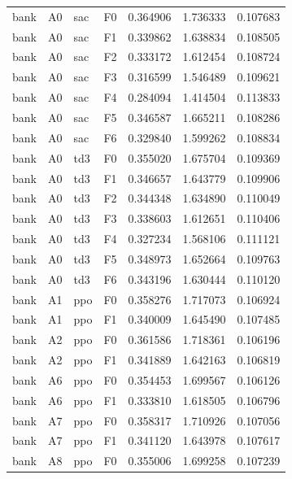 \begin{tabular}{llllrrr}
      bank &      A0 &       sac &  F0 &  0.364906 &  1.736333 &  0.107683 \\
      bank &      A0 &       sac &  F1 &  0.339862 &  1.638834 &  0.108505 \\
      bank &      A0 &       sac &  F2 &  0.333172 &  1.612454 &  0.108724 \\
      bank &      A0 &       sac &  F3 &  0.316599 &  1.546489 &  0.109621 \\
      bank &      A0 &       sac &  F4 &  0.284094 &  1.414504 &  0.113833 \\
      bank &      A0 &       sac &  F5 &  0.346587 &  1.665211 &  0.108286 \\
      bank &      A0 &       sac &  F6 &  0.329840 &  1.599262 &  0.108834 \\
      bank &      A0 &       td3 &  F0 &  0.355020 &  1.675704 &  0.109369 \\
      bank &      A0 &       td3 &  F1 &  0.346657 &  1.643779 &  0.109906 \\
      bank &      A0 &       td3 &  F2 &  0.344348 &  1.634890 &  0.110049 \\
      bank &      A0 &       td3 &  F3 &  0.338603 &  1.612651 &  0.110406 \\
      bank &      A0 &       td3 &  F4 &  0.327234 &  1.568106 &  0.111121 \\
      bank &      A0 &       td3 &  F5 &  0.348973 &  1.652664 &  0.109763 \\
      bank &      A0 &       td3 &  F6 &  0.343196 &  1.630444 &  0.110120 \\
      bank &      A1 &       ppo &  F0 &  0.358276 &  1.717073 &  0.106924 \\
      bank &      A1 &       ppo &  F1 &  0.340009 &  1.645490 &  0.107485 \\
      bank &      A2 &       ppo &  F0 &  0.361586 &  1.718361 &  0.106196 \\
      bank &      A2 &       ppo &  F1 &  0.341889 &  1.642163 &  0.106819 \\
      bank &      A6 &       ppo &  F0 &  0.354453 &  1.699567 &  0.106126 \\
      bank &      A6 &       ppo &  F1 &  0.333810 &  1.618505 &  0.106796 \\
      bank &      A7 &       ppo &  F0 &  0.358317 &  1.710926 &  0.107056 \\
      bank &      A7 &       ppo &  F1 &  0.341120 &  1.643978 &  0.107617 \\
      bank &      A8 &       ppo &  F0 &  0.355006 &  1.699258 &  0.107239 \\

\end{tabular}
